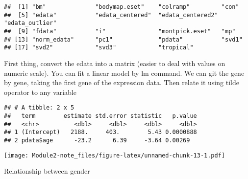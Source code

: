 \documentclass[]{article}
\newenvironment{Shaded}{\begin{snugshade}}{\end{snugshade}}
\newcommand{\KeywordTok}[1]{\textcolor[rgb]{0.13,0.29,0.53}{\textbf{#1}}}
\newcommand{\DataTypeTok}[1]{\textcolor[rgb]{0.13,0.29,0.53}{#1}}
\newcommand{\DecValTok}[1]{\textcolor[rgb]{0.00,0.00,0.81}{#1}}
\newcommand{\StringTok}[1]{\textcolor[rgb]{0.31,0.60,0.02}{#1}}
\newcommand{\OperatorTok}[1]{\textcolor[rgb]{0.81,0.36,0.00}{\textbf{#1}}}
\newcommand{\NormalTok}[1]{#1}
\begin{document}
\begin{verbatim}
##  [1] "bm"              "bodymap.eset"    "colramp"         "con"            
##  [5] "edata"           "edata_centered"  "edata_centered2" "edata_outlier"  
##  [9] "fdata"           "i"               "montpick.eset"   "mp"             
## [13] "norm_edata"      "pc1"             "pdata"           "svd1"           
## [17] "svd2"            "svd3"            "tropical"
\end{verbatim}

First thing, convert the edata into a matrix (easier to deal with values
on numeric scale). You can fit a linear model by lm command. We can git
the gene by gene, taking the first gene of the expression data. Then
relate it using tilde operator to any variable

\begin{Shaded}
\end{Shaded}

\begin{verbatim}
## # A tibble: 2 x 5
##   term        estimate std.error statistic   p.value
##   <chr>          <dbl>     <dbl>     <dbl>     <dbl>
## 1 (Intercept)   2188.     403.        5.43 0.0000888
## 2 pdata$age      -23.2      6.39     -3.64 0.00269
\end{verbatim}

\begin{Shaded}
\end{Shaded}

\texttt{[image: Module2-note\_files/figure-latex/unnamed-chunk-13-1.pdf]}

Relationship between gender

\begin{Shaded}
\end{Shaded}
\end{document}
